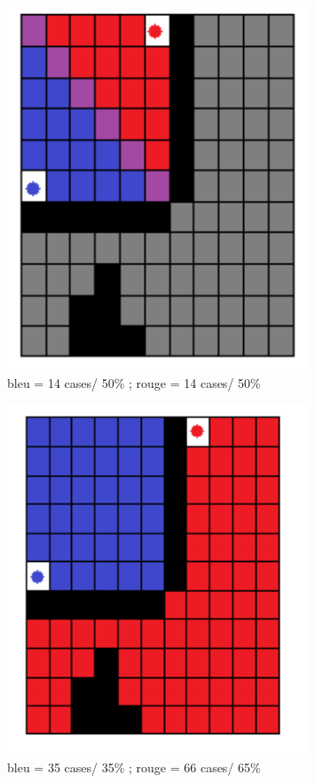 \begin{figure}[H]
	\centering
	\includegraphics[width=0.8\textwidth, keepaspectratio, height=0.2\textheight]{./pics/nbr_case_mini.png}	
	\caption{bleu = 14 cases/ 50\% ; rouge = 14 cases/ 50\%}
\end{figure}

\begin{figure}[H]
	\centering
	\includegraphics[width=0.8\textwidth, keepaspectratio, height=0.2\textheight]{./pics/nbr_case_maxi.png}	
	\caption{bleu = 35 cases/ 35\% ; rouge = 66 cases/ 65\%}
\end{figure}


